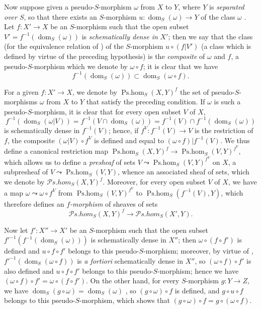 \begin{env}[20.3.2]\label{IV.20.3.2}
Now suppose given a pseudo-$S$-morphism $\omega$ from $X$ to $Y$, where $Y$ is \emph{separated over $S$}, so that there exists an $S$-morphism $u:\operatorname{dom}_S(\omega)\to Y$ of the class $\omega$ .
Let $f:X'\to X$ be an $S$-morphism such that the open subset $V'=f^{-1}(\operatorname{dom}_S(\omega))$ is \emph{schematically dense in} $X'$; then we say that the class (for the equivalence relation of ) of the $S$-morphism $u\circ(f|V')$ (a class which is defined by virtue of the preceding hypothesis) is the \emph{composite} of $\omega$ and $f$, a pseudo-$S$-morphism which we denote by $\omega\circ f$; it is clear that we have
\[
\label{IV.20.3.2.1}
  f^{-1}(\operatorname{dom}_S(\omega))\subset\operatorname{dom}_S(\omega\circ f).
  \tag{20.3.2.1}
\]

For a given $f:X'\to X$, we denote by $\operatorname{Ps.hom}_S(X,Y)^f$ the set of pseudo-$S$-morphisms $\omega$ from $X$ to $Y$ that satisfy the preceding condition.
If $\omega$ is such a pseudo-$S$-morphism, it is clear that for every open subset $V$ of $X$,
\[
  f^{-1}(\operatorname{dom}_S(\omega|V))=f^{-1}(V\cap\operatorname{dom}_S(\omega))=f^{-1}(V)\cap f^{-1}(\operatorname{dom}_S(\omega))
\]
is schematically dense in $f^{-1}(V)$; hence, if $f^V:f^{-1}(V)\to V$ is the restriction of $f$, the composite $(\omega|V)\circ f^V$ is defined and equal to $(\omega\circ f)|f^{-1}(V)$.
We thus define a
canonical restriction map $\operatorname{Ps.hom}_S(X,Y)^f\to\operatorname{Ps.hom}_S(V,Y)^{f^V}$, which allows us to define a \emph{presheaf} of sets $V\leadsto\operatorname{Ps.hom}_S(V,Y)^{f^V}$ on $X$, a subpresheaf of $V\leadsto\operatorname{Ps.hom}_S(V,Y)$, whence an associated sheaf of sets, which we denote by $\mathscr{P}\!s.\mathit{hom}_S(X,Y)^f$.
Moreover, for every open subset $V$ of $X$, we have a map $\omega\leadsto\omega\circ f^V$ from $\operatorname{Ps.hom}_S(V,Y)^{f^V}$ to $\operatorname{Ps.hom}_S(f^{-1}(V),Y)$, which therefore defines an \emph{$f$-morphism} of sheaves of sets
\[
  \mathscr{P}\!s.\mathit{hom}_S(X,Y)^f\to\mathscr{P}\!s.\mathit{hom}_S(X',Y).
\]
\end{env}

\begin{env}[20.3.3]
\label{IV.20.3.3}
Now let $f':X''\to X'$ be an $S$-morphism such that the open subset $f'^{-1}(f^{-1}(\operatorname{dom}_S(\omega)))$ is schematically dense in $X''$; then $\omega\circ(f\circ f')$ is defined and $u\circ f\circ f'$ belongs to this pseudo-$S$-morphism; moreover, by virtue of , $f'^{-1}(\operatorname{dom}_S(\omega\circ f))$ is \emph{a fortiori} schematically dense in $X''$, so $(\omega\circ f)\circ f'$ is also defined and $u\circ f\circ f'$ belongs to this pseudo-$S$-morphism; hence we have $(\omega\circ f)\circ f'=\omega\circ(f\circ f')$.
On the other hand, for every $S$-morphism $g:Y\to Z$, we have $\operatorname{dom}_S(g\circ\omega)=\operatorname{dom}_S(\omega)$ , so $(g\circ\omega)\circ f$ is defined, and $g\circ u\circ f$ belongs to this pseudo-$S$-morphism, which shows that $(g\circ\omega)\circ f=g\circ(\omega\circ f)$.
\end{env}

